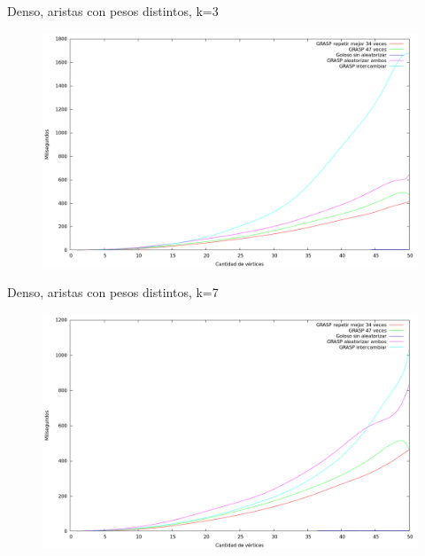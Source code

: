 \vspace*{0.5cm}

Denso, aristas con pesos distintos, k=3
\vspace*{0.5cm}

\begin{figure}[h]
  \begin{center}
    \includegraphics[scale=0.35]{imagenes/ej6-denso-pesos-distintos-k3-tiempo.png}
  \end{center}
\end{figure}

\vspace*{0.5cm}

Denso, aristas con pesos distintos, k=7
\vspace*{0.5cm}

\begin{figure}[h]
  \begin{center}
    \includegraphics[scale=0.35]{imagenes/ej6-denso-pesos-distintos-k7-tiempo.png}
  \end{center}
\end{figure}

